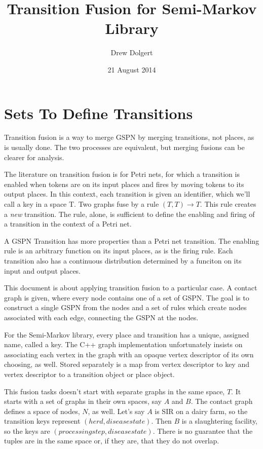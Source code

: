 \documentclass{article}
\begin{document}
\title{Transition Fusion for Semi-Markov Library}

\author{Drew Dolgert}
\date{21 August 2014}

\section{Sets To Define Transitions}
Transition fusion is a way to merge GSPN by merging transitions,
not places, as is usually done. The two processes are equivalent,
but merging fusions can be clearer for analysis.

The literature on transition fusion is for Petri nets, for which
a transition is enabled when tokens are on its input places and
fires by moving tokens to its output places. In this context,
each transition is given an identifier, which we'll call a key
in a space T. Two graphs fuse by a rule $(T,T)→T$. This rule
creates a \emph{new} transition. The rule, alone, is sufficient
to define the enabling and firing of a transition in the context
of a Petri net.

A GSPN Transition has more properties than a Petri net transition.
The enabling rule is an arbitrary function on its input places,
as is the firing rule. Each transition also has a continuous
distribution determined by a funciton on its input and output places.

This document is about applying transition fusion to a particular
case. A contact graph is given, where every node contains one
of a set of GSPN. The goal is to construct a single GSPN from
the nodes and a set of rules which create nodes associated with
each edge, connecting the GSPN at the nodes.

For the Semi-Markov library, every place and transition has a
unique, assigned name, called a key. The C++ graph implementation
unfortunately insists on associating each vertex in the graph
with an opaque vertex descriptor of its own choosing, as well.
Stored separately is a map from vertex descriptor to key and
vertex descriptor to a transition object or place object.

This fusion tasks doesn't start with separate graphs in the
same space, $T$. It starts with a set of graphs in their
own spaces, say $A$ and $B$. The contact graph defines
a space of nodes, $N$, as well. Let's say $A$ is SIR
on a dairy farm, so the transition keys represent $(herd, disease state)$.
Then $B$ is a slaughtering facility, so the keys are
$(processing step, disease state)$. There is no guarantee
that the tuples are in the same space or, if they are, that
they do not overlap.
\end{document}
